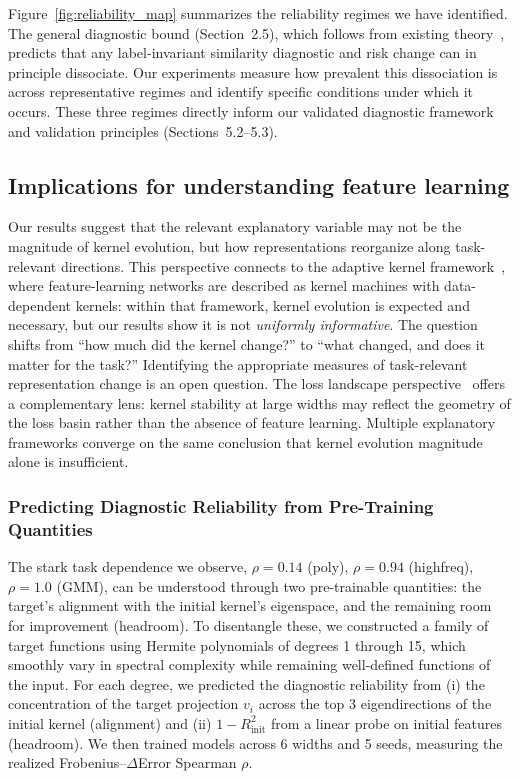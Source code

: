 \documentclass[10pt]{article}
\begin{document}
Figure~\ref{fig:reliability_map} summarizes the reliability regimes we have identified.  The general diagnostic bound (Section~2.5), which follows from existing theory~\citep{canatar2021spectral}, predicts that any label-invariant similarity diagnostic and risk change can in principle dissociate.  Our experiments measure how prevalent this dissociation is across representative regimes and identify specific conditions under which it occurs. These three regimes directly inform our validated diagnostic framework and validation principles (Sections~5.2--5.3).

\subsection{Implications for understanding feature learning}

Our results suggest that the relevant explanatory variable may not be the magnitude of kernel evolution, but how representations reorganize along task-relevant directions.  This perspective connects to the adaptive kernel framework~\citep{lauditi2025adaptive}, where feature-learning networks are described as kernel machines with data-dependent kernels: within that framework, kernel evolution is expected and necessary, but our results show it is not \emph{uniformly informative}.  The question shifts from ``how much did the kernel change?'' to ``what changed, and does it matter for the task?''  Identifying the appropriate measures of task-relevant representation change is an open question.  The loss landscape perspective~\citep{fort2019deep} offers a complementary lens: kernel stability at large widths may reflect the geometry of the loss basin rather than the absence of feature learning. Multiple explanatory frameworks converge on the same conclusion that kernel evolution magnitude alone is insufficient.

\subsubsection{Predicting Diagnostic Reliability from Pre-Training Quantities}

The stark task dependence we observe, $\rho=0.14$ (poly), $\rho=0.94$ (highfreq), $\rho=1.0$ (GMM), can be understood through two pre-trainable quantities: the target's alignment with the initial kernel's eigenspace, and the remaining room for improvement (headroom). To disentangle these, we constructed a family of target functions using Hermite polynomials of degrees 1 through 15, which smoothly vary in spectral complexity while remaining well-defined functions of the input. For each degree, we predicted the diagnostic reliability from (i) the concentration of the target projection $v_i$ across the top 3 eigendirections of the initial kernel (alignment) and (ii) $1-R^2_{\text{init}}$ from a linear probe on initial features (headroom). We then trained models across 6 widths and 5 seeds, measuring the realized Frobenius--$\Delta$Error Spearman $\rho$.
\end{document}
